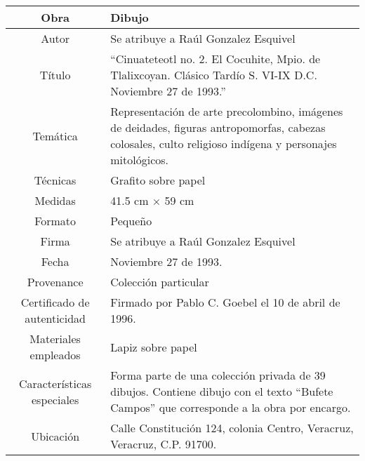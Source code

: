 \begin{table}[H]
\centering
\begin{tabular}{|c|m{}|}
\hline
Obra& Dibujo	\\
\hline
Autor & Se atribuye a Ra\'ul Gonzalez Esquivel\\
\hline
T\'itulo & ``Cinuateteotl no. 2. El Cocuhite, Mpio. de Tlalixcoyan. Cl\'asico Tard\'io S. VI-IX D.C. Noviembre 27 de 1993.''\\
\hline
Tem\'atica & Representaci\'on de arte precolombino, im\'agenes de deidades, figuras antropomorfas, cabezas colosales, culto religioso ind\'igena y personajes mitol\'ogicos.\\
\hline
T\'ecnicas &Grafito sobre papel \\
\hline
Medidas & 41.5 cm $\times$ 59 cm \\
\hline
 Formato & Peque\~no \\
 \hline
 Firma & Se atribuye a Ra\'ul Gonzalez Esquivel\\ 
 \hline
  Fecha & Noviembre 27 de 1993.\\
 \hline
 Provenance & Colecci\'on particular\\
 \hline
 Certificado de autenticidad& Firmado por Pablo C. Goebel el 10 de abril de 1996.  \\
 \hline 
  Materiales empleados & Lapiz sobre papel\\
 \hline
 Caracter\'isticas especiales & Forma parte de una colecci\'on privada de 39 dibujos. 
Contiene dibujo con el texto ``Bufete Campos'' que corresponde a la obra por encargo. \\
\hline 
Ubicaci\'on & Calle Constituci\'on 124, colonia Centro, Veracruz, Veracruz, C.P. 91700.\\
\hline

\end{tabular}
\end{table}

